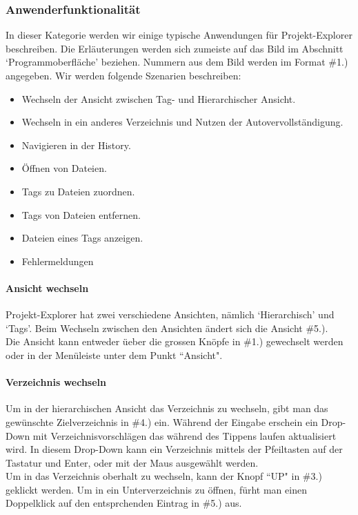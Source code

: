 \documentclass[10pt,paper=a4,final]{scrartcl}
\begin{document}
\subsubsection{Anwenderfunktionalit\"at}
In dieser Kategorie werden wir einige typische Anwendungen f\"ur Projekt-Explorer beschreiben. Die Erl\"auterungen werden sich zumeiste auf das Bild im Abschnitt ‘Programmoberfl\"ache’ beziehen. Nummern aus dem Bild werden im Format \#1.) angegeben.
Wir werden folgende Szenarien beschreiben:
\begin{itemize}
  \item Wechseln der Ansicht zwischen Tag- und Hierarchischer Ansicht.
  \item Wechseln in ein anderes Verzeichnis und Nutzen der Autovervollst\"andigung.
  \item Navigieren in der History.
  \item \"Offnen von Dateien.
  \item Tags zu Dateien zuordnen.
  \item Tags von Dateien entfernen.
  \item Dateien eines Tags anzeigen.
  \item Fehlermeldungen
\end{itemize}
\paragraph{Ansicht wechseln}
Projekt-Explorer hat zwei verschiedene Ansichten, n\"amlich ‘Hierarchisch’ und ‘Tags’. Beim Wechseln zwischen den Ansichten \"andert sich die Ansicht \#5.).\\
Die Ansicht kann entweder \"ueber die grossen Kn\"opfe in \#1.) gewechselt werden oder in der Men\"uleiste unter dem Punkt “Ansicht".
\paragraph{Verzeichnis wechseln}
Um in der hierarchischen Ansicht das Verzeichnis zu wechseln, gibt man das gew\"unschte Zielverzeichnis in \#4.) ein. W\"ahrend der Eingabe erschein ein Drop-Down mit Verzeichnisvorschl\"agen das w\"ahrend des Tippens laufen aktualisiert wird. In diesem Drop-Down kann ein Verzeichnis mittels der Pfeiltasten auf der Tastatur und Enter, oder mit der Maus ausgew\"ahlt werden.\\
Um in das Verzeichnis oberhalt zu wechseln, kann der Knopf “UP" in \#3.) geklickt werden. Um in ein Unterverzeichnis zu \"offnen, f\"urht man einen Doppelklick auf den entsprchenden Eintrag in \#5.) aus.
\end{document}

